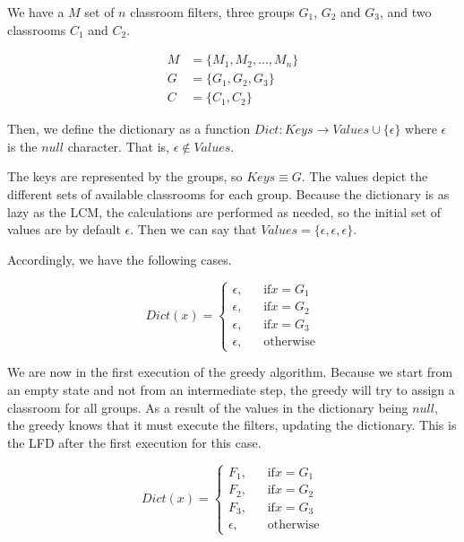 We have a $M$ set of $n$ classroom filters, three groups $G_{1}$, $G_{2}$ and $G_{3}$, and two classrooms $C_{1}$ and $C_{2}$.

\begin{align}
    M &= \{ M_{1}, M_{2}, ..., M_{n} \}\\
    G &= \{ G_{1}, G_{2}, G_{3} \}\\
    C &= \{ C_{1}, C_{2} \}
\end{align}

Then, we define the dictionary as a function $Dict: Keys \rightarrow Values \cup \{ \epsilon \}$ where $\epsilon$ is the $null$ character. That is, $\epsilon \notin Values$.

The keys are represented by the groups, so $Keys \equiv G$. The values depict the different sets of available classrooms for each group. Because the dictionary is as lazy as the LCM, the calculations are performed as needed, so the initial set of values are by default $\epsilon$. Then we can say that $Values = \{ \epsilon, \epsilon, \epsilon \}$.

Accordingly, we have the following cases.

\[
    Dict(x) =
    \begin{cases}
        \epsilon\text{,} &\quad\text{if} x = G_{1}\\
        \epsilon\text{,} &\quad\text{if} x = G_{2}\\
        \epsilon\text{,} &\quad\text{if} x = G_{3}\\
        \epsilon\text{,} &\quad\text{otherwise}
    \end{cases}
\]

We are now in the first execution of the greedy algorithm. Because we start from an empty state and not from an intermediate step, the greedy will try to assign a classroom for all groups. As a result of the values in the dictionary being $null$, the greedy knows that it must execute the filters, updating the dictionary. This is the LFD after the first execution for this case.

\[
    Dict(x) =
    \begin{cases}
        F_{1}\text{,} &\quad\text{if} x = G_{1}\\
        F_{2}\text{,} &\quad\text{if} x = G_{2}\\
        F_{3}\text{,} &\quad\text{if} x = G_{3}\\
        \epsilon\text{,} &\quad\text{otherwise}
    \end{cases}
\]


